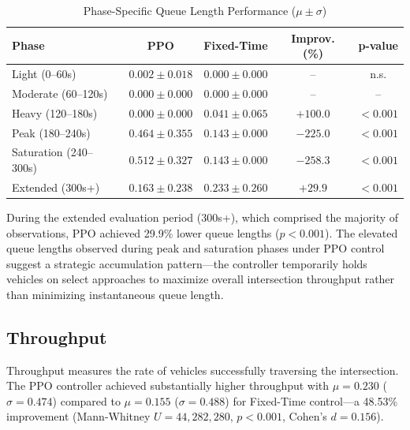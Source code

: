 \documentclass[11pt, a4paper]{report}
\begin{document}
\begin{table}[htbp]
\centering
\caption{Phase-Specific Queue Length Performance ($\mu \pm \sigma$)}
\label{tab:queue_phases}
\begin{tabular}{lcccc}
\toprule
\textbf{Phase} & \textbf{PPO} & \textbf{Fixed-Time} & \textbf{Improv. (\%)} & \textbf{p-value} \\
\midrule
Light (0--60s) & $0.002 \pm 0.018$ & $0.000 \pm 0.000$ & -- & n.s. \\
Moderate (60--120s) & $0.000 \pm 0.000$ & $0.000 \pm 0.000$ & -- & -- \\
Heavy (120--180s) & $0.000 \pm 0.000$ & $0.041 \pm 0.065$ & $+100.0$ & $<0.001$ \\
Peak (180--240s) & $0.464 \pm 0.355$ & $0.143 \pm 0.000$ & $-225.0$ & $<0.001$ \\
Saturation (240--300s) & $0.512 \pm 0.327$ & $0.143 \pm 0.000$ & $-258.3$ & $<0.001$ \\
Extended (300s+) & $0.163 \pm 0.238$ & $0.233 \pm 0.260$ & $+29.9$ & $<0.001$ \\
\bottomrule
\end{tabular}
\end{table}

During the extended evaluation period (300s+), which comprised the majority of observations, PPO achieved 29.9\% lower queue lengths ($p < 0.001$). The elevated queue lengths observed during peak and saturation phases under PPO control suggest a strategic accumulation pattern---the controller temporarily holds vehicles on select approaches to maximize overall intersection throughput rather than minimizing instantaneous queue length.

\subsection{Throughput}

Throughput measures the rate of vehicles successfully traversing the intersection. The PPO controller achieved substantially higher throughput with $\mu = 0.230$ ($\sigma = 0.474$) compared to $\mu = 0.155$ ($\sigma = 0.488$) for Fixed-Time control---a 48.53\% improvement (Mann-Whitney $U = 44,282,280$, $p < 0.001$, Cohen's $d = 0.156$).
\end{document}
